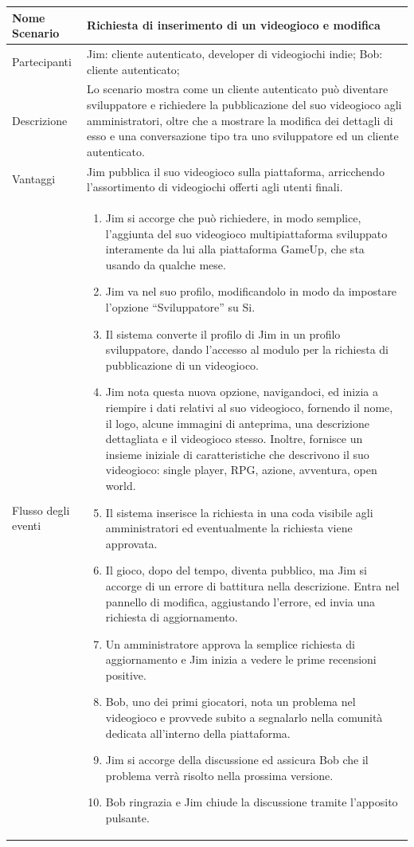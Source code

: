 	\small\begin{tabular}{|| l | p{30em} ||} 
	\hline
	Nome Scenario & Richiesta di inserimento di un videogioco e modifica\\
	\hline
	Partecipanti & Jim: cliente autenticato, developer di videogiochi indie;
	Bob: cliente autenticato;\\
	\hline
	Descrizione & Lo scenario mostra come un cliente autenticato può diventare sviluppatore e richiedere la pubblicazione del suo videogioco agli amministratori, oltre che a mostrare la modifica dei dettagli di esso e una conversazione tipo tra uno sviluppatore ed un cliente autenticato.\\
	\hline
	Vantaggi & Jim pubblica il suo videogioco sulla piattaforma, arricchendo l’assortimento di videogiochi offerti agli utenti finali.\\
	\hline
	Flusso degli eventi &
	\begin{enumerate}
		\item Jim si accorge che può richiedere, in modo semplice, l’aggiunta del suo videogioco multipiattaforma sviluppato interamente da lui alla piattaforma GameUp, che sta usando da qualche mese.
		\item Jim va nel suo profilo, modificandolo in modo da impostare l’opzione “Sviluppatore” su Si.
		\item Il sistema converte il profilo di Jim in un profilo sviluppatore, dando l’accesso al modulo per la richiesta di pubblicazione di un videogioco.
		\item Jim nota questa nuova opzione, navigandoci, ed inizia a riempire i dati relativi al suo videogioco, fornendo il nome, il logo, alcune immagini di anteprima, una descrizione dettagliata e il videogioco stesso. Inoltre, fornisce un insieme iniziale di caratteristiche che descrivono il suo videogioco: single player, RPG, azione, avventura, open world.
		\item Il sistema inserisce la richiesta in una coda visibile agli amministratori ed eventualmente la richiesta viene approvata.
		\item Il gioco, dopo del tempo, diventa pubblico, ma Jim si accorge di un errore di battitura nella descrizione. Entra nel pannello di modifica, aggiustando l’errore, ed invia una richiesta di aggiornamento.
		\item Un amministratore approva la semplice richiesta di aggiornamento e Jim inizia a vedere le prime recensioni positive.
		\item Bob, uno dei primi giocatori, nota un problema nel videogioco e provvede subito a segnalarlo nella comunità dedicata all’interno della piattaforma.
		\item Jim si accorge della discussione ed assicura Bob che il problema verrà risolto nella prossima versione.
		\item Bob ringrazia e Jim chiude la discussione tramite l’apposito pulsante.
	\end{enumerate} \\
	\hline
	\end{tabular}

